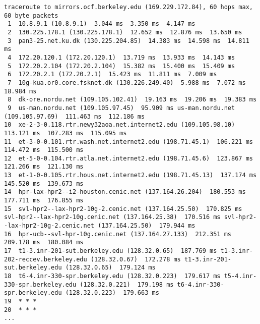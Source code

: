 \documentclass{acm_proc_article-sp}
\begin{document}
\begin{lstlisting}
traceroute to mirrors.ocf.berkeley.edu (169.229.172.84), 60 hops max, 60 byte packets
 1  10.8.9.1 (10.8.9.1)  3.044 ms  3.350 ms  4.147 ms
 2  130.225.178.1 (130.225.178.1)  12.652 ms  12.876 ms  13.650 ms
 3  pan3-25.net.ku.dk (130.225.204.85)  14.383 ms  14.598 ms  14.811 ms
 4  172.20.120.1 (172.20.120.1)  13.719 ms  13.933 ms  14.143 ms
 5  172.20.2.104 (172.20.2.104)  15.382 ms  15.400 ms  15.409 ms
 6  172.20.2.1 (172.20.2.1)  15.423 ms  11.811 ms  7.009 ms
 7  10g-kua.or0.core.fsknet.dk (130.226.249.40)  5.988 ms  7.072 ms  18.984 ms
 8  dk-ore.nordu.net (109.105.102.41)  19.163 ms  19.206 ms  19.383 ms
 9  us-man.nordu.net (109.105.97.45)  95.909 ms us-man.nordu.net (109.105.97.69)  111.463 ms  112.186 ms
10  xe-2-3-0.118.rtr.newy32aoa.net.internet2.edu (109.105.98.10)  113.121 ms  107.283 ms  115.095 ms
11  et-3-0-0.101.rtr.wash.net.internet2.edu (198.71.45.1)  106.221 ms  114.472 ms  115.500 ms
12  et-5-0-0.104.rtr.atla.net.internet2.edu (198.71.45.6)  123.867 ms  121.266 ms  121.130 ms
13  et-1-0-0.105.rtr.hous.net.internet2.edu (198.71.45.13)  137.174 ms  145.520 ms  139.673 ms
14  hpr-lax-hpr2--i2-houston.cenic.net (137.164.26.204)  180.553 ms  177.711 ms  176.855 ms
15  svl-hpr2--lax-hpr2-10g-2.cenic.net (137.164.25.50)  170.825 ms svl-hpr2--lax-hpr2-10g.cenic.net (137.164.25.38)  170.516 ms svl-hpr2--lax-hpr2-10g-2.cenic.net (137.164.25.50)  179.944 ms
16  hpr-ucb--svl-hpr-10g.cenic.net (137.164.27.133)  212.351 ms  209.178 ms  180.084 ms
17  t1-3.inr-201-sut.berkeley.edu (128.32.0.65)  187.769 ms t1-3.inr-202-reccev.berkeley.edu (128.32.0.67)  172.278 ms t1-3.inr-201-sut.berkeley.edu (128.32.0.65)  179.124 ms
18  t6-4.inr-330-spr.berkeley.edu (128.32.0.223)  179.617 ms t5-4.inr-330-spr.berkeley.edu (128.32.0.221)  179.198 ms t6-4.inr-330-spr.berkeley.edu (128.32.0.223)  179.663 ms
19  * * *
20  * * *
...
\end{lstlisting}
\end{document}
